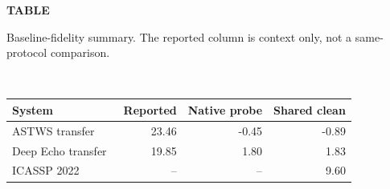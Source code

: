 \par\noindent
{}
\label{tab:baseline-fidelity}
\begin{center}
\textbf{TABLE \thetable}\\
\parbox{0.96\linewidth}{\centering Baseline-fidelity summary. The reported column is context only, not a same-protocol comparison.}\\[0.5ex]
\scriptsize
\begin{tabular}{lrrr}
\hline
System & Reported & Native probe & Shared clean \\
\hline
ASTWS transfer~\cite{zhao2024astws} & 23.46 & -0.45 & -0.89 \\
Deep Echo transfer~\cite{zhao2024deepecho} & 19.85 & 1.80 & 1.83 \\
ICASSP 2022~\cite{cutler2022aec} & -- & -- & 9.60 \\
\hline
\end{tabular}
\end{center}
\par\medskip
